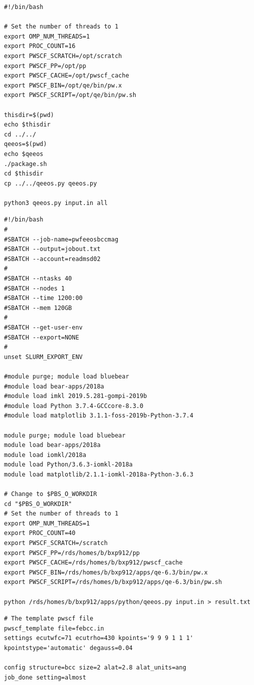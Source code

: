 \documentclass[12pt,twoside]{manual}
\begin{document}
\begin{appendices}
\begin{lstlisting}[style=inputfile,caption={Job Bash Script}]
#!/bin/bash

# Set the number of threads to 1
export OMP_NUM_THREADS=1
export PROC_COUNT=16
export PWSCF_SCRATCH=/opt/scratch
export PWSCF_PP=/opt/pp
export PWSCF_CACHE=/opt/pwscf_cache
export PWSCF_BIN=/opt/qe/bin/pw.x
export PWSCF_SCRIPT=/opt/qe/bin/pw.sh

thisdir=$(pwd)
echo $thisdir
cd ../../
qeeos=$(pwd)
echo $qeeos
./package.sh
cd $thisdir
cp ../../qeeos.py qeeos.py

python3 qeeos.py input.in all
\end{lstlisting}


\begin{lstlisting}[style=inputfile,caption={Job SBATCH Script}]
#!/bin/bash
#
#SBATCH --job-name=pwfeeosbccmag
#SBATCH --output=jobout.txt
#SBATCH --account=readmsd02
#
#SBATCH --ntasks 40
#SBATCH --nodes 1
#SBATCH --time 1200:00
#SBATCH --mem 120GB
#
#SBATCH --get-user-env
#SBATCH --export=NONE
#
unset SLURM_EXPORT_ENV

#module purge; module load bluebear
#module load bear-apps/2018a
#module load imkl 2019.5.281-gompi-2019b
#module load Python 3.7.4-GCCcore-8.3.0
#module load matplotlib 3.1.1-foss-2019b-Python-3.7.4

module purge; module load bluebear
module load bear-apps/2018a
module load iomkl/2018a
module load Python/3.6.3-iomkl-2018a
module load matplotlib/2.1.1-iomkl-2018a-Python-3.6.3

# Change to $PBS_O_WORKDIR
cd "$PBS_O_WORKDIR"
# Set the number of threads to 1
export OMP_NUM_THREADS=1
export PROC_COUNT=40
export PWSCF_SCRATCH=/scratch
export PWSCF_PP=/rds/homes/b/bxp912/pp
export PWSCF_CACHE=/rds/homes/b/bxp912/pwscf_cache
export PWSCF_BIN=/rds/homes/b/bxp912/apps/qe-6.3/bin/pw.x
export PWSCF_SCRIPT=/rds/homes/b/bxp912/apps/qe-6.3/bin/pw.sh

python /rds/homes/b/bxp912/apps/python/qeeos.py input.in > result.txt
\end{lstlisting}







\begin{lstlisting}[style=inputfile,caption={QEEoS Input File}]
# The template pwscf file
pwscf_template file=febcc.in
settings ecutwfc=71 ecutrho=430 kpoints='9 9 9 1 1 1' kpointstype='automatic' degauss=0.04 

config structure=bcc size=2 alat=2.8 alat_units=ang
job_done setting=almost


\end{lstlisting}
\end{appendices}
\end{document}
